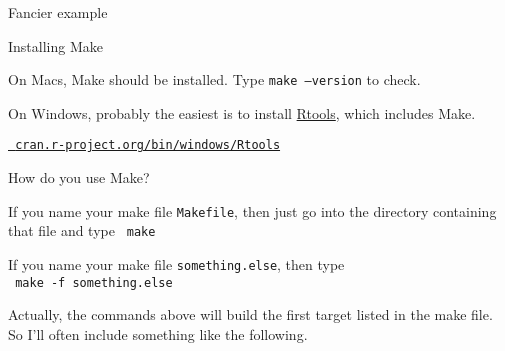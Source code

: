 \documentclass[12pt,t]{beamer}
\begin{document}
{\begin{frame}[fragile]{Fancier example}
\end{frame}



\begin{frame}[c]{Installing Make}

  \bbi
  \item On Macs, Make should be installed. Type {\tt make --version}
    to check.

  \item On Windows, probably the easiest is to install
    \href{https://cran.r-project.org/bin/windows/Rtools/}{Rtools},
    which includes Make.
    \bi
    \item[]
      \href{https://cran.r-project.org/bin/windows/Rtools}{\tt
        \footnotesize cran.r-project.org/bin/windows/Rtools}
      \ei
      \ei


\end{frame}


\begin{frame}[fragile]{How do you use Make?}

\vspace{6pt}

{\small
\bi
\item If you name your make file {\tt Makefile}, then just go into the
directory containing that file and type {\tt \color{hilit} make}

\item If you name your make file {\tt something.else}, then type \\
{\tt \color{hilit} make -f something.else}

\item Actually, the commands above will build the {\color{vhilit} first}
  target listed in the make file. So I'll often include something like
  the following.

}
\end{frame}}
\end{document}
